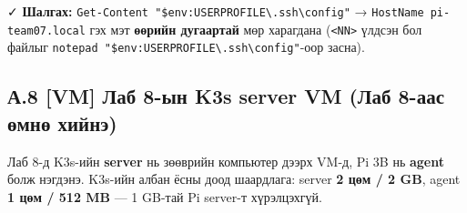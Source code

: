 ✓ \textbf{Шалгах:} \texttt{Get-Content\ "\$env:\allowbreak{}USERPROFILE\textbackslash{}\allowbreak{}.\allowbreak{}ssh\textbackslash{}\allowbreak{}config"} → \texttt{HostName\ pi-team07.\allowbreak{}local} гэх мэт \textbf{өөрийн дугаартай} мөр харагдана (\texttt{\textless{}NN\textgreater{}} үлдсэн бол файлыг \texttt{notepad\ "\$env:\allowbreak{}USERPROFILE\textbackslash{}\allowbreak{}.\allowbreak{}ssh\textbackslash{}\allowbreak{}config"}-оор засна).

\hypertarget{ux430.8-vm-ux43bux430ux431-8-ux44bux43d-k3s-server-vm-ux43bux430ux431-8-ux430ux430ux441-ux4e9ux43cux43dux4e9-ux445ux438ux439ux43dux44d}{%
\subsection{А.8 {[}VM{]} Лаб 8-ын K3s server VM (Лаб 8-аас өмнө хийнэ)}\label{ux430.8-vm-ux43bux430ux431-8-ux44bux43d-k3s-server-vm-ux43bux430ux431-8-ux430ux430ux441-ux4e9ux43cux43dux4e9-ux445ux438ux439ux43dux44d}}

Лаб 8-д K3s-ийн \textbf{server} нь зөөврийн компьютер дээрх VM-д, Pi 3B нь \textbf{agent} болж нэгдэнэ. K3s-ийн албан ёсны доод шаардлага: server \textbf{2 цөм / 2 GB}, agent \textbf{1 цөм / 512 MB} --- 1 GB-тай Pi server-т хүрэлцэхгүй.

